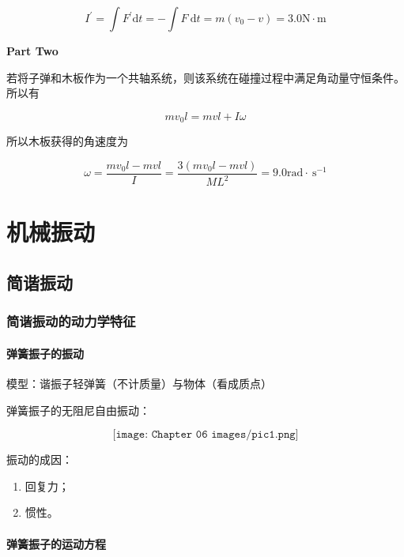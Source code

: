 \documentclass[
	12pt, %
	a4paper, %
]{myLegrandOrangeBook}
\begin{document}
    $$
        I^{\prime}=\int F^{\prime} \mathrm{d} t=-\int F \mathrm{~d} t=m\left(v_0-v\right)=3.0 \mathrm{N \cdot m}
    $$

    \textbf{Part Two}

    若将子弹和木板作为一个共轴系统，则该系统在碰撞过程中满足角动量守恒条件。
    所以有

    $$
        m v_0 l=m v l+I \omega
    $$

    所以木板获得的角速度为

    $$
        \omega=\frac{m v_0 l-m v l}{I}=\frac{3\left(m v_0 l-m v l\right)}{M L^2}
        =9.0 \mathrm{rad} \cdot \mathrm{~s}^{-1}
    $$

\chapterspaceabove{6.25cm} %
\chapterspacebelow{7.5cm} %

\chapter{机械振动}

\section{简谐振动}

\subsection{简谐振动的动力学特征}

\subsubsection{弹簧振子的振动}

    模型：谐振子轻弹簧（不计质量）与物体（看成质点）

    弹簧振子的无阻尼自由振动：

    \[
        \texttt{[image: Chapter 06 images/pic1.png]}
    \]

    振动的成因：

    \begin{enumerate}
        \item 回复力；
        \item 惯性。
    \end{enumerate}

\subsubsection{弹簧振子的运动方程}
\end{document}
